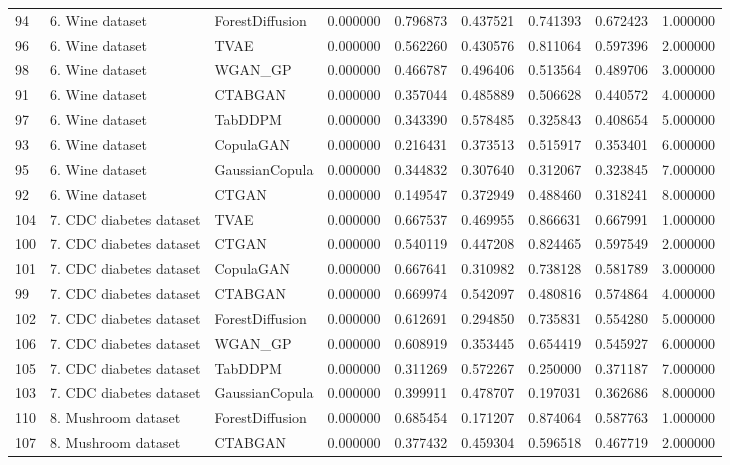 \begin{tabular}{lllrrrrrr}
94 & 6. Wine dataset & ForestDiffusion & 0.000000 & 0.796873 & 0.437521 & 0.741393 & 0.672423 & 1.000000 \\
96 & 6. Wine dataset & TVAE & 0.000000 & 0.562260 & 0.430576 & 0.811064 & 0.597396 & 2.000000 \\
98 & 6. Wine dataset & WGAN_GP & 0.000000 & 0.466787 & 0.496406 & 0.513564 & 0.489706 & 3.000000 \\
91 & 6. Wine dataset & CTABGAN & 0.000000 & 0.357044 & 0.485889 & 0.506628 & 0.440572 & 4.000000 \\
97 & 6. Wine dataset & TabDDPM & 0.000000 & 0.343390 & 0.578485 & 0.325843 & 0.408654 & 5.000000 \\
93 & 6. Wine dataset & CopulaGAN & 0.000000 & 0.216431 & 0.373513 & 0.515917 & 0.353401 & 6.000000 \\
95 & 6. Wine dataset & GaussianCopula & 0.000000 & 0.344832 & 0.307640 & 0.312067 & 0.323845 & 7.000000 \\
92 & 6. Wine dataset & CTGAN & 0.000000 & 0.149547 & 0.372949 & 0.488460 & 0.318241 & 8.000000 \\
104 & 7. CDC diabetes dataset & TVAE & 0.000000 & 0.667537 & 0.469955 & 0.866631 & 0.667991 & 1.000000 \\
100 & 7. CDC diabetes dataset & CTGAN & 0.000000 & 0.540119 & 0.447208 & 0.824465 & 0.597549 & 2.000000 \\
101 & 7. CDC diabetes dataset & CopulaGAN & 0.000000 & 0.667641 & 0.310982 & 0.738128 & 0.581789 & 3.000000 \\
99 & 7. CDC diabetes dataset & CTABGAN & 0.000000 & 0.669974 & 0.542097 & 0.480816 & 0.574864 & 4.000000 \\
102 & 7. CDC diabetes dataset & ForestDiffusion & 0.000000 & 0.612691 & 0.294850 & 0.735831 & 0.554280 & 5.000000 \\
106 & 7. CDC diabetes dataset & WGAN_GP & 0.000000 & 0.608919 & 0.353445 & 0.654419 & 0.545927 & 6.000000 \\
105 & 7. CDC diabetes dataset & TabDDPM & 0.000000 & 0.311269 & 0.572267 & 0.250000 & 0.371187 & 7.000000 \\
103 & 7. CDC diabetes dataset & GaussianCopula & 0.000000 & 0.399911 & 0.478707 & 0.197031 & 0.362686 & 8.000000 \\
110 & 8. Mushroom dataset & ForestDiffusion & 0.000000 & 0.685454 & 0.171207 & 0.874064 & 0.587763 & 1.000000 \\
107 & 8. Mushroom dataset & CTABGAN & 0.000000 & 0.377432 & 0.459304 & 0.596518 & 0.467719 & 2.000000 \\

\end{tabular}
